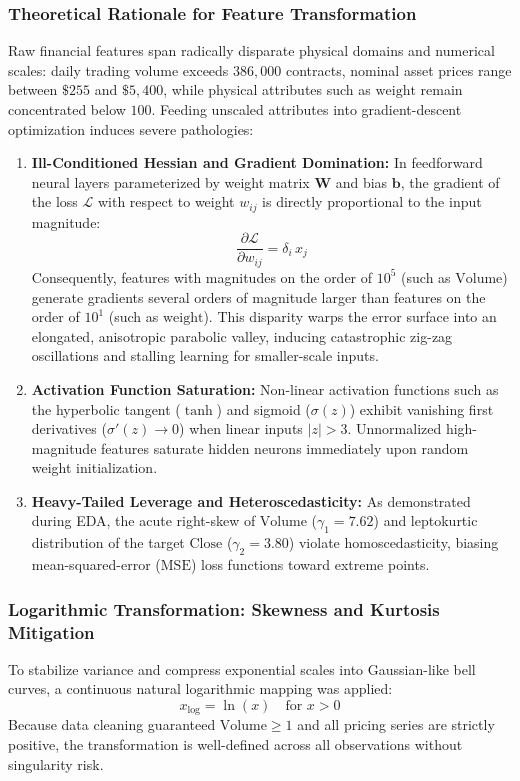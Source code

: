 \documentclass[conference]{IEEEtran}
\begin{document}
\subsubsection{Theoretical Rationale for Feature Transformation}
Raw financial features span radically disparate physical domains and numerical scales: daily trading volume exceeds $386{,}000$ contracts, nominal asset prices range between $\$255$ and $\$5{,}400$, while physical attributes such as $\text{weight}$ remain concentrated below $100$. Feeding unscaled attributes into gradient-descent optimization induces severe pathologies:
\begin{enumerate}
    \item \textbf{Ill-Conditioned Hessian and Gradient Domination:} In feedforward neural layers parameterized by weight matrix $\mathbf{W}$ and bias $\mathbf{b}$, the gradient of the loss $\mathcal{L}$ with respect to weight $w_{ij}$ is directly proportional to the input magnitude:
    \begin{equation}
        \frac{\partial \mathcal{L}}{\partial w_{ij}} = \delta_i \, x_j
    \end{equation}
    Consequently, features with magnitudes on the order of $10^5$ (such as $\text{Volume}$) generate gradients several orders of magnitude larger than features on the order of $10^1$ (such as $\text{weight}$). This disparity warps the error surface into an elongated, anisotropic parabolic valley, inducing catastrophic zig-zag oscillations and stalling learning for smaller-scale inputs.
    \item \textbf{Activation Function Saturation:} Non-linear activation functions such as the hyperbolic tangent ($\tanh$) and sigmoid ($\sigma(z)$) exhibit vanishing first derivatives ($\sigma'(z) \to 0$) when linear inputs $|z| > 3$. Unnormalized high-magnitude features saturate hidden neurons immediately upon random weight initialization.
    \item \textbf{Heavy-Tailed Leverage and Heteroscedasticity:} As demonstrated during EDA, the acute right-skew of $\text{Volume}$ ($\gamma_1 = 7.62$) and leptokurtic distribution of the target $\text{Close}$ ($\gamma_2 = 3.80$) violate homoscedasticity, biasing mean-squared-error ($\text{MSE}$) loss functions toward extreme points.
\end{enumerate}

\subsubsection{Logarithmic Transformation: Skewness and Kurtosis Mitigation}
To stabilize variance and compress exponential scales into Gaussian-like bell curves, a continuous natural logarithmic mapping was applied:
\begin{equation}
    x_{\text{log}} = \ln(x) \quad \text{for } x > 0
\end{equation}
Because data cleaning guaranteed $\text{Volume} \ge 1$ and all pricing series are strictly positive, the transformation is well-defined across all observations without singularity risk.
\end{document}
